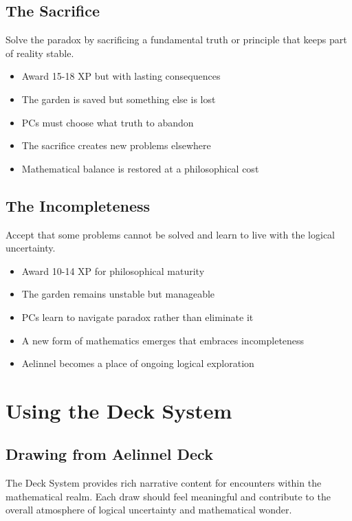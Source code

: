 \documentclass[11pt]{article}
\begin{document}
\subsection{The Sacrifice}

Solve the paradox by sacrificing a fundamental truth or principle that keeps part of reality stable.
\begin{itemize}
\item Award 15-18 XP but with lasting consequences
\item The garden is saved but something else is lost
\item PCs must choose what truth to abandon
\item The sacrifice creates new problems elsewhere
\item Mathematical balance is restored at a philosophical cost
\end{itemize}

\subsection{The Incompleteness}

Accept that some problems cannot be solved and learn to live with the logical uncertainty.
\begin{itemize}
\item Award 10-14 XP for philosophical maturity
\item The garden remains unstable but manageable
\item PCs learn to navigate paradox rather than eliminate it
\item A new form of mathematics emerges that embraces incompleteness
\item Aelinnel becomes a place of ongoing logical exploration
\end{itemize}

\section{Using the Deck System}

\subsection{Drawing from Aelinnel Deck}

The Deck System provides rich narrative content for encounters within the mathematical realm. Each draw should feel meaningful and contribute to the overall atmosphere of logical uncertainty and mathematical wonder.
\end{document}
